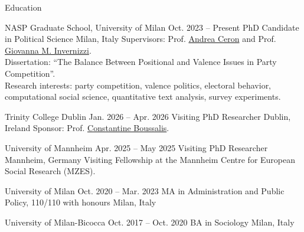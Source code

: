 \documentclass{cv}
\begin{document}

\begin{rSection}{Education}

\begin{cvEntryNoBullets}
{NASP Graduate School, University of Milan}
{Oct. 2023 -- Present}
{PhD Candidate in Political Science}
{Milan, Italy}
Supervisors: Prof. \href{https://www.andreaceron.com}{Andrea Ceron} and Prof. \href{https://www.giovannainvernizzi.com}{Giovanna M. Invernizzi}. \\[0.2em]
Dissertation: \enquote{The Balance Between Positional and Valence Issues in Party Competition}. \\[0.2em]
Research interests: party competition, valence politics, electoral behavior, computational social science, quantitative text analysis, survey experiments.
\end{cvEntryNoBullets}

\begin{cvEntryNoBullets}
{Trinity College Dublin}
{Jan. 2026 -- Apr. 2026}
{Visiting PhD Researcher}
{Dublin, Ireland}
Sponsor: Prof. \href{https://boussalis.com/}{Constantine Boussalis}.
\end{cvEntryNoBullets}

\begin{cvEntryNoBullets}
{University of Mannheim}
{Apr. 2025 -- May 2025}
{Visiting PhD Researcher}
{Mannheim, Germany}
Visiting Fellowship at the Mannheim Centre for European Social Research (MZES).
\end{cvEntryNoBullets}

\begin{cvSimpleEntry}
{University of Milan}
{Oct. 2020 -- Mar. 2023}
{MA in Administration and Public Policy, 110/110 with honours}
{Milan, Italy}
\end{cvSimpleEntry}

\begin{cvSimpleEntry}
{University of Milan-Bicocca}
{Oct. 2017 -- Oct. 2020}
{BA in Sociology}
{Milan, Italy}
\end{cvSimpleEntry}

\end{rSection}

\end{document}
